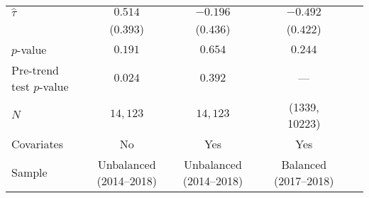 \begin{table}[tbh]
\begin{threeparttable}
\begin{tabular}{lcccccc}
\quad $\hat \tau$                &                                                 $0.514$ &                                                $-0.196$ &                                                         &                                                $-0.492$ &                                                         &                                                         \\
\quad                            &                                               ($0.393$) &                                               ($0.436$) &                                                         &                                               ($0.422$) &                                                         &                                                         \\
\quad $p$-value                  &                                                 $0.191$ &                                                 $0.654$ &                                                         &                                                 $0.244$ &                                                         &                                                         \\
\quad Pre-trend test $p$-value   &                                                 $0.024$ &                                                 $0.392$ &                                                         &                                                     --- &                                                         &                                                         \\
\quad $N$                        &                                                $14,123$ &                                                $14,123$ &                                                         &                                           (1339, 10223) &                                                         &                                                         \\
\quad Covariates                 &                                                      No &                                                     Yes &                                                         &                                                     Yes &                                                         &                                                         \\
\quad Sample                     &                                 Unbalanced (2014--2018) &                                 Unbalanced (2014--2018) &                                                         &                                   Balanced (2017--2018) &                                                         &                                                         \\

\end{tabular}
\end{threeparttable}
\end{table}
